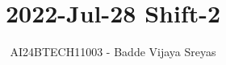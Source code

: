\documentclass[journal]{IEEEtran}
\begin{document}

\vspace{3cm}

\title{2022-Jul-28 Shift-2}
\author{AI24BTECH11003 - Badde Vijaya Sreyas}
{\let\newpage\relax\maketitle}

\renewcommand{\thefigure}{\theenumi}
\renewcommand{\thetable}{\theenumi}
\setlength{\intextsep}{10pt} %


\renewcommand{\thetable}{\theenumi}
\end{document}
